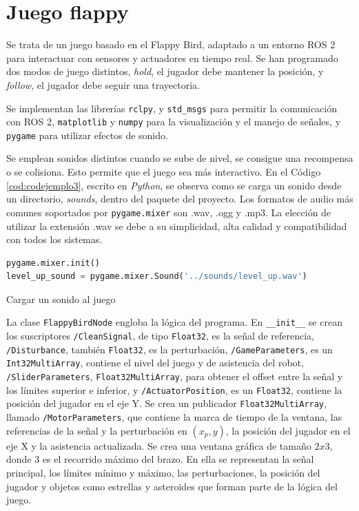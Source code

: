 \section{Juego flappy}
\label{section:game}

Se trata de un juego basado en el Flappy Bird, adaptado a un entorno ROS 2 para interactuar con sensores y actuadores en tiempo real.
Se han programado dos modos de juego distintos, \textit{hold}, el jugador debe mantener la posición, y \textit{follow}, el jugador debe seguir una trayectoria.

Se implementan las librerías \verb|rclpy|, y \verb|std_msgs| para permitir la comunicación con ROS 2, \verb|matplotlib| y \verb|numpy| para la visualización y el manejo de señales, y \verb|pygame| para utilizar efectos de sonido.

Se emplean sonidos distintos cuando se sube de nivel, se consigue una recompensa o se colisiona.
Esto permite que el juego sea más interactivo.
En el Código \ref{cod:codejemplo3}, escrito en \textit{Python}, se observa como se carga un sonido desde un directorio, \textit{sounds}, dentro del paquete del proyecto.
Los formatos de audio más comunes soportados por \verb|pygame.mixer| son .wav, .ogg y .mp3.
La elección de utilizar la extensión .wav se debe a su simplicidad, alta calidad y compatibilidad con todos los sistemas.

\begin{code}[h]
\begin{lstlisting}[language=Python]
pygame.mixer.init()
level_up_sound = pygame.mixer.Sound('../sounds/level_up.wav')
\end{lstlisting}
\caption[Cargar un sonido al juego]{Cargar un sonido al juego}
\label{cod:codejemplo3}
\end{code}

La clase \verb|FlappyBirdNode| engloba la lógica del programa.
En \verb|__init__| se crean los suscriptores \verb|/CleanSignal|, de tipo \verb|Float32|, es la señal de referencia, \verb|/Disturbance|, también \verb|Float32|, es la perturbación, \verb|/GameParameters|, es un \verb|Int32MultiArray|, contiene el nivel del juego y de asistencia del robot, \verb|/SliderParameters|, \verb|Float32MultiArray|, para obtener el offset entre la señal y los límites superior e inferior, y \verb|/ActuatorPosition|, es un \verb|Float32|, contiene la posición del jugador en el eje Y.
Se crea un publicador \verb|Float32MultiArray|, llamado \verb|/MotorParameters|, que contiene la marca de tiempo de la ventana, las referencias de la señal y la perturbación en $(x_p, y)$, la posición del jugador en el eje X y la asistencia actualizada.
Se crea una ventana gráfica de tamaño $2x3$, donde 3 es el recorrido máximo del brazo.
En ella se representan la señal principal, los límites mínimo y máximo, las perturbaciones, la posición del jugador y objetos como estrellas y asteroides que forman parte de la lógica del juego.


